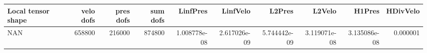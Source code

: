 \begin{tabular}{lrrrrrrrrr}
\toprule
Local tensor shape &  velo dofs &  pres dofs &  sum dofs &     LinfPres &     LinfVelo &       L2Pres &       L2Velo &       H1Pres &  HDivVelo \\
\midrule
               NAN &     658800 &     216000 &    874800 & 1.008778e-08 & 2.617026e-09 & 5.744442e-09 & 3.119071e-08 & 3.135086e-08 &  0.000001 \\
\bottomrule
\end{tabular}
